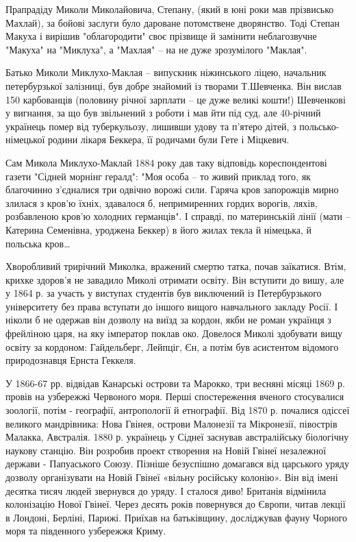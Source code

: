Прапрадіду Миколи Миколайовича, Степану, (який в юні роки мав прізвисько
Махлай), за бойові заслуги було дароване потомствене дворянство. Тоді Степан
Макуха і вирішив "облагородити" своє прізвище й замінити неблагозвучне "Макуха"
на "Миклуха", а "Махлая" – на не дуже зрозумілого "Маклая".

Батько Миколи Миклухо-Маклая – випускник ніжинського ліцею, начальник
петербурзької залізниці, був добре знайомий із творами Т.Шевченка. Він вислав
150 карбованців (половину річної зарплати – це дуже великі кошти!) Шевченкові у
вигнання, за що був звільнений з роботи і мав йти під суд, але 40-річний
українець помер від туберкульозу, лишивши удову та п'ятеро дітей, з
польсько-німецької родини лікаря Беккера, її родичами були Гете і Міцкевич.

Сам Микола Миклухо-Маклай 1884 року дав таку відповідь кореспондентові газети
"Сідней морнінг гералд": "Моя особа – то живий приклад того, як благочинно
з'єдналися три одвічно ворожі сили. Гаряча кров запорожців мирно злилася з
кров'ю їхніх, здавалося б, непримиренних гордих ворогів, ляхів, розбавленою
кров'ю холодних германців". І справді, по материнській лінії (мати – Катерина
Семенівна, уроджена Беккер) в його жилах текла й німецька, й польська кров…

Хворобливий трирічний Миколка, вражений смертю татка, почав заїкатися. Втім,
крихке здоров'я не завадило Миколі отримати освіту. Він вступити до вишу, але у
1864 р. за участь у виступах студентів був виключений із Петербурзького
університету без права вступати до іншого вищого навчального закладу Росії. І
ніколи б не одержав він дозволу на виїзд за кордон, якби не роман українця з
фрейліною царя, на яку імператор поклав око. Довелося Миколі здобувати вищу
освіту за кордоном: Гайдельберг, Лейпціг, Єн, а потім був асистентом відомого
природознавця Ернста Геккеля.

У 1866-67 рр. відвідав Канарські острови та Марокко, три весняні місяці 1869 р.
провів на узбережжі Червоного моря. Перші спостереження вченого стосувалися
зоології, потім - географії, антропології й етнографії. Від 1870 р. почалися
одіссеї великого мандрівника: Нова Гвінея, острови Малонезії та Мікронезії,
півострів Малакка, Австралія. 1880 р. українець у Сіднеї заснував австралійську
біологічну наукову станцію. Він розробив проект створення на Новій Гвінеї
незалежної держави - Папуаського Союзу. Пізніше безуспішно домагався від
царського уряду дозволу організувати на Новій Гвінеї «вільну російську
колонію». Він від імені десятка тисяч людей звернувся до уряду. І сталося диво!
Британія відмінила колонізацію Нової Гвінеї. Через десять років повернувся до
Європи, читав лекції в Лондоні, Берліні, Парижі. Приїхав на батьківщину,
досліджував фауну Чорного моря та південного узбережжя Криму.


